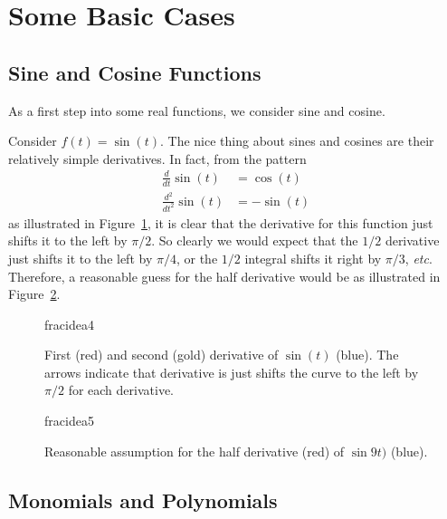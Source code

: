 \section{Some Basic Cases}
\subsection{Sine and Cosine Functions}
As a first step into some real functions, we consider sine and cosine.

\begin{example}
  Consider $f(t) = \sin(t)$. The nice thing about sines and cosines are their relatively simple derivatives. In fact, from the pattern
  \begin{align*}
    \frac{d}{dt} \sin(t) &= \cos(t) \\
    \frac{d^2}{dt^2} \sin(t) &= -\sin(t)
  \end{align*}
  as illustrated in Figure~\ref{fig:fracidea4}, it is clear that the derivative for this function just shifts it to the left by $\pi/2$. So clearly we would expect that the $1/2$ derivative just shifts it to the left by $\pi/4$, or the $1/2$ integral shifts it right by $\pi/3$, \textit{etc}. Therefore, a reasonable guess for the half derivative would be as illustrated in Figure~\ref{fig:fracidea5}.

  \begin{figure}
    \centering
    {fracidea4}
    \caption{First (red) and second (gold) derivative of $\sin(t)$ (blue). The arrows indicate that derivative is just shifts the curve to the left by $\pi/2$ for each derivative.}
    \label{fig:fracidea4}
  \end{figure}

  \begin{figure}
    \centering
    {fracidea5}
  \caption{Reasonable assumption for the half derivative (red) of $\sin9t)$ (blue).}
  \label{fig:fracidea5}
\end{figure}

\end{example}

\subsection{Monomials and Polynomials}

